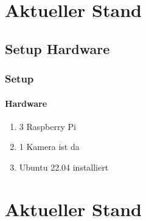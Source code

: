 \documentclass[]{beamer}
\begin{document}
\section{Aktueller Stand}
\subsection{Setup Hardware}
\begin{frame}
\frametitle{Setup}
\framesubtitle{Hardware}
\begin{enumerate}
    \item 3 Raspberry Pi
    \item 1 Kamera ist da
    \item Ubuntu 22.04 installiert
\end{enumerate}
\end{frame}


\section{Aktueller Stand}
\end{document}
